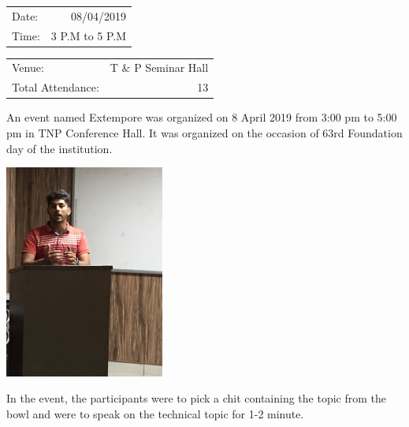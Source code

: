\documentclass[12pt, a4 paper]{article}
\begin{document}
\begin{center}
\begin{multicols}{2}
\begin{tabular}{l r}
Date: & 08/04/2019\\ %
Time: & 3 P.M to 5 P.M \\ %
\end{tabular}

\columnbreak

\begin{tabular}{l r}
Venue: & T \& P Seminar Hall \\ %
Total Attendance: & 13 \\ %
\end{tabular}
\end{multicols}

\bigskip

\begin{Large}
\begin{multicols}{2}
\justify
An event named Extempore was organized on 8 April 2019 from 3:00 pm to 5:00 pm in TNP Conference Hall. It was organized on the occasion of 63rd Foundation day of the institution.
\columnbreak

\includegraphics[width=\linewidth,height=7cm]{image2.jpg}
\end{multicols}

\bigskip
\justify
In the event, the participants were to pick a chit containing the topic from the bowl and were to speak on the technical topic for 1-2 minute.


\newpage 


\end{Large}
\end{center}
\end{document}
